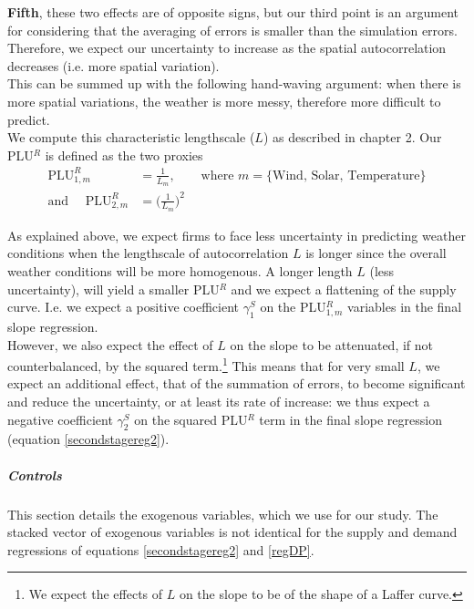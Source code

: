 \textbf{Fifth}, these two effects are of opposite signs, but our third point is an argument for considering that the averaging of errors is smaller than the simulation errors. Therefore, we expect our uncertainty to increase as the spatial autocorrelation decreases (i.e. more spatial variation). \\

This can be summed up with the following hand-waving argument: when there is more spatial variations, the weather is more messy, therefore more difficult to predict. \\

We compute this characteristic lengthscale ($L$) as described in chapter 2. Our PLU$^R$ is defined as the two proxies 
\begin{align}
 \text{PLU}^R_{1,m} &= \frac{1}{L_m}, \quad \quad  \text{where } m=\{\text{Wind, Solar, Temperature}\} \\
  \text{and }  \quad \text{PLU}^R_{2,m} &=  \bigl(\frac{1}{L_m}\bigr)^2
\end{align}

As explained above, we expect firms to face less uncertainty in predicting weather conditions when the lengthscale of autocorrelation $L$ is longer since the overall weather conditions will be more homogenous. A longer length $L$ (less uncertainty), will yield a smaller PLU$^R$ and we expect a flattening of the supply curve. I.e. we expect a positive coefficient $\gamma^S_1$ on the PLU$^R_{1,m}$ variables in the final slope regression.\\

However, we also expect the effect of $L$ on the slope to be attenuated, if not counterbalanced, by the squared term.\footnote{We expect the effects of $L$ on the slope to be of the shape of a Laffer curve.} This means that for very small $L$, we expect an additional effect, that of the summation of errors, to become significant and reduce the uncertainty, or at least its rate of increase: we thus expect a negative coefficient $\gamma^S_2$ on the squared PLU$^R$ term in the final slope regression (equation \ref{secondstagereg2}). 

\subparagraph{Controls}
\label{controlssec}

This section details the exogenous variables, which we use for our study. The stacked vector of exogenous variables is not identical for the supply and demand regressions of equations \ref{secondstagereg2} and \ref{regDP}.\\ 

